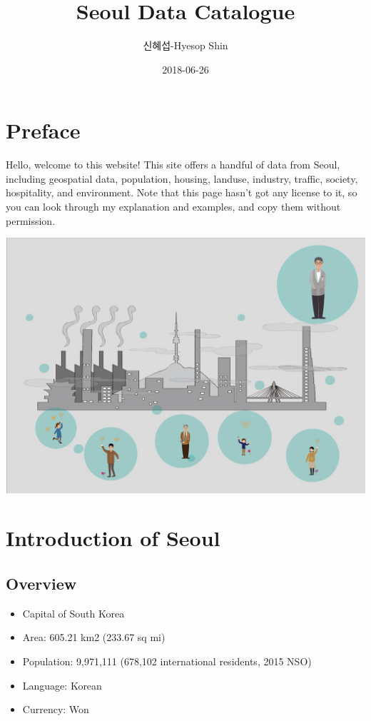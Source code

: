 \documentclass[]{book}
\title{Seoul Data Catalogue}
\author{신혜섭-Hyesop Shin}
\date{2018-06-26}
\providecommand{\tightlist}{%
  \setlength{\itemsep}{0pt}\setlength{\parskip}{0pt}}
\theoremstyle{definition}
\theoremstyle{definition}
\theoremstyle{definition}
\theoremstyle{remark}
\begin{document}
\maketitle

{
\setcounter{tocdepth}{1}
\tableofcontents
}
\chapter*{Preface}\label{preface}

Hello, welcome to this website! This site offers a handful of data from
Seoul, including geospatial data, population, housing, landuse,
industry, traffic, society, hospitality, and environment. Note that this
page hasn't got any license to it, so you can look through my
explanation and examples, and copy them without permission.

\begin{center}\includegraphics[width=19.47in]{images/01_intro} \end{center}

\chapter{Introduction of Seoul}\label{introduction-of-seoul}

\section{Overview}\label{overview}

\begin{itemize}
\tightlist
\item
  Capital of South Korea
\item
  Area: 605.21 km2 (233.67 sq mi)
\item
  Population: 9,971,111 (678,102 international residents, 2015 NSO)
\item
  Language: Korean
\item
  Currency: Won
\end{itemize}
\end{document}
